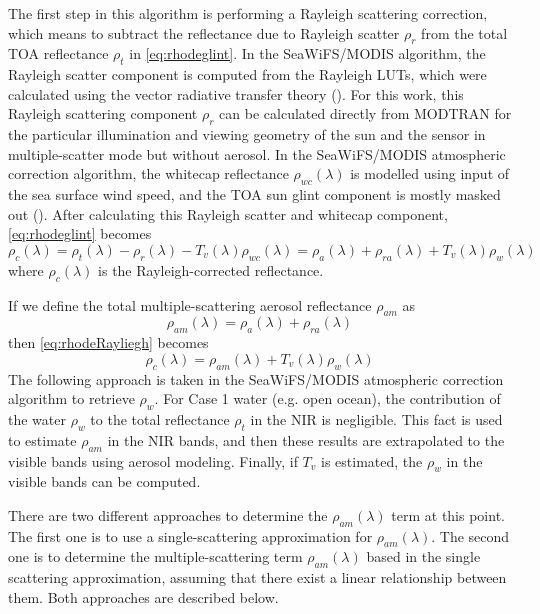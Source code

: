 The first step in this algorithm is performing a Rayleigh scattering correction, which means to subtract the reflectance due to Rayleigh scatter $\rho_r$ from the total TOA reflectance $\rho_t$ in \autoref{eq:rhodeglint}. In the SeaWiFS/MODIS algorithm, the Rayleigh scatter component is computed from the Rayleigh LUTs, which were calculated using the vector radiative transfer theory (\cite{Wang:1991,IOCCG:2010}). For this work, this Rayleigh scattering component $\rho_r$ can be calculated directly from MODTRAN for the particular illumination and viewing geometry of the sun and the sensor in multiple-scatter mode but without aerosol. In the SeaWiFS/MODIS atmospheric correction algorithm, the whitecap reflectance $\rho_{wc}(\lambda)$ is modelled using input of the sea surface wind speed, and the TOA sun glint component is mostly masked out (\cite{IOCCG:2010}). After calculating this Rayleigh scatter and whitecap component, \autoref{eq:rhodeglint} becomes 
\begin{equation}\label{eq:rhodeRayliegh}
 \rho_c(\lambda) = \rho_t(\lambda)-\rho_r(\lambda)-T_v(\lambda)\rho_{wc}(\lambda) = \rho_a(\lambda)+\rho_{ra}(\lambda)+T_v(\lambda)\rho_{w}(\lambda)
\end{equation}
where $\rho_c(\lambda)$ is the Rayleigh-corrected reflectance. 

If we define the total multiple-scattering aerosol reflectance $\rho_{am}$ as
\begin{equation}\label{eq:rhoam1}
  \rho_{am}(\lambda) = \rho_a(\lambda)+\rho_{ra}(\lambda)
\end{equation}
then \autoref{eq:rhodeRayliegh} becomes
\begin{equation}\label{eq:rhoam}
 \rho_c(\lambda) = \rho_{am}(\lambda) + T_v(\lambda)\rho_{w}(\lambda)
\end{equation}
\indent The following approach is taken in the SeaWiFS/MODIS atmospheric correction algorithm to retrieve $\rho_w$. For Case 1 water (e.g. open ocean), the contribution of the water $\rho_{w}$ to the total reflectance $\rho_t$ in the NIR is negligible. This fact is used to estimate $\rho_{am}$ in the NIR bands, and then these results are extrapolated to the visible bands using aerosol modeling. Finally, if $T_v$ is estimated, the $\rho_w$ in the visible bands can be computed.

There are two different approaches to determine the $\rho_{am}(\lambda)$ term at this point. The first one is to use a single-scattering approximation for $\rho_{am}(\lambda)$. The second one is to determine the multiple-scattering term $\rho_{am}(\lambda)$ based in the single scattering approximation, assuming that there exist a linear relationship between them. Both approaches are described below.

